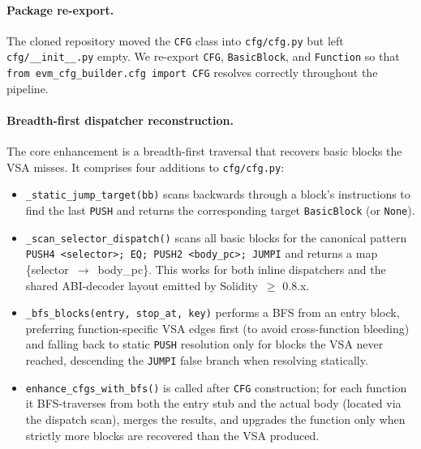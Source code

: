 \documentclass{article}
\begin{document}
\paragraph{Package re-export.}
The cloned repository moved the \texttt{CFG} class into
\texttt{cfg/cfg.py} but left \texttt{cfg/\_\_init\_\_.py} empty. We re-export
\texttt{CFG}, \texttt{BasicBlock}, and \texttt{Function} so that
\texttt{from evm\_cfg\_builder.cfg import CFG} resolves correctly throughout the
pipeline.

\paragraph{Breadth-first dispatcher reconstruction.}
The core enhancement is a breadth-first traversal that recovers basic blocks the
VSA misses. It comprises four additions to \texttt{cfg/cfg.py}:
\begin{itemize}
  \item \texttt{\_static\_jump\_target(bb)} scans backwards through a block's
        instructions to find the last \texttt{PUSH} and returns the corresponding
        target \texttt{BasicBlock} (or \texttt{None}).
  \item \texttt{\_scan\_selector\_dispatch()} scans all basic blocks for the
        canonical pattern
        \texttt{PUSH4 <selector>; EQ; PUSH2 <body\_pc>; JUMPI} and returns a map
        \{selector~$\rightarrow$~body\_pc\}. This works for both inline dispatchers
        and the shared ABI-decoder layout emitted by Solidity~$\geq$ 0.8.x.
  \item \texttt{\_bfs\_blocks(entry, stop\_at, key)} performs a BFS from an entry
        block, preferring function-specific VSA edges first (to avoid
        cross-function bleeding) and falling back to static \texttt{PUSH}
        resolution only for blocks the VSA never reached, descending the
        \texttt{JUMPI} false branch when resolving statically.
  \item \texttt{enhance\_cfgs\_with\_bfs()} is called after \texttt{CFG}
        construction; for each function it BFS-traverses from both the entry stub
        and the actual body (located via the dispatch scan), merges the results,
        and upgrades the function only when strictly more blocks are recovered than
        the VSA produced.
\end{itemize}
\end{document}
